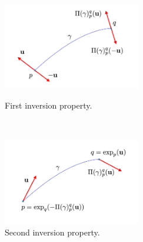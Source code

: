 \begin{figure}[htbp]
	\centering
	\begin{minipage}[b]{3cm}
		\hspace{-4cm}
		\centering
		\includegraphics[width=6cm]{figures/inversion_1.pdf}
		\caption{First inversion property.}
		\label{fig:inversion_propr1}
	\end{minipage}
	\ \hspace{9mm} \
	\begin{minipage}[b]{4cm}
		\centering
		\includegraphics[width=6cm]{figures/inversion_2.pdf}
		\caption{Second inversion property.}
		\label{fig:inversion_propr2}
	\end{minipage}
\end{figure}

